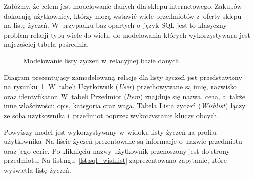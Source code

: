 Załóżmy, że celem jest modelowanie danych dla sklepu internetowego. Zakupów dokonują użytkownicy, którzy mogą wstawić wiele przedmiotów z~oferty sklepu na listę życzeń. W~przypadku baz opartych o~język SQL jest to klasyczny problem relacji typu wiele-do-wielu, do modelowania których wykorzystywana jest najczęściej tabela pośrednia. 

\begin{figure}[ht!]
	\centering

	\caption{Modelowanie listy życzeń w~relacyjnej bazie danych.}
	\label{fig:er_wishlist}
\end{figure}

Diagram prezentujący zamodelowaną relację dla listy życzeń jest przedstawiony na rysunku~\ref{fig:er_wishlist}. W~tabeli Użytkownik (\emph{User}) przechowywane są imię, nazwisko oraz identyfikator. W~tabeli Przedmiot (\emph{Item}) znajduje się nazwa, cena, a~także inne właściwości: opis, kategoria oraz waga. Tabela Lista życzeń (\emph{Wishlist}) łączy ze sobą użytkownika i~przedmiot poprzez wykorzystanie kluczy obcych. 

Powyższy model jest wykorzystywany w~widoku listy życzeń na profilu użytkownika. Na liście życzeń prezentowane są informacje o~nazwie przedmiotu oraz jego cenie. Po kliknięciu nazwy użytkownik przenoszony jest do strony przedmiotu. Na listingu~\ref{lst:sql_wishlist} zaprezentowano zapytanie, które wyświetla listę życzeń.

